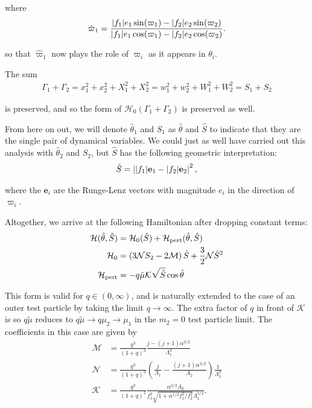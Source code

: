 \documentclass[usenatbib,twocolumn]{mnras}
\DeclarePairedDelimiter{\abs}{|}{|}
\begin{document}
\noindent
where
\begin{equation}
\hat\varpi_1 = \frac{\abs{f_1} e_1\sin(\varpi_1) -
  \abs{f_2}e_2\sin(\varpi_2)} {\abs{f_1}e_1\cos(\varpi_1) -
  \abs{f_2}e_2\cos(\varpi_2)}.
\end{equation}

\noindent
so that \(\hat\varpi_1\) now plays the role of \(\varpi_i\) as it appears in \(\theta_i\).

The sum
\begin{align}
  \Gamma_1 +\Gamma_2 = x_1^2+x_2^2 + X_1^2 + X_2^2
  = w_1^2+w_2^2 + W_1^2 + W_2^2 = S_1 + S_2
\end{align}

\noindent
is preserved, and so the form of \(\mathcal H_0(\Gamma_1+\Gamma_2)\)
is preserved as well.

From here on out, we will denote \(\hat\theta_1\) and \(S_1\) as
\(\hat\theta\) and \(\hat S\) to indicate that they are the single pair of
dynamical variables.  We could just as well have carried out this
analysis with \(\hat\theta_2\) and \(S_2\), but \(\hat S\) has the following
geometric interpretation:
\begin{align}
  \hat S = \left\lvert \abs{f_1}\mathbf{e}_1 - \abs{f_2}\mathbf{e}_2\right\rvert^2,
\end{align}

\noindent
where the \(\mathbf{e}_i\) are the Runge-Lenz vectors with magnitude
\(e_i\) in the direction of \(\varpi_i\).  

Altogether, we arrive at the following Hamiltonian after
dropping constant terms:
\begin{align}
  \label{eq:HShat}\mathcal H(\hat \theta, \hat S) &= \mathcal H_0(\hat S) + \mathcal H_{\rm pert}(\hat \theta, \hat S) \\
  \mathcal H_0
  &= \left( 3\mathcal NS_2 -2\mathcal M\right) \hat S
    + \frac32 \mathcal N \hat S^2 \\
  \mathcal H_{\rm pert}
  &= - q\tilde\mu\mathcal K\sqrt{\hat S}\cos\hat\theta
\end{align}

\noindent This form is valid for \(q\in (0,\infty)\), and is
naturally extended to the case of an outer test particle by taking the
limit \(q\to\infty\).  The extra factor of \(q\) in front of \(\mathcal K\)
is so \(q\tilde\mu\) reduces to \(q\tilde\mu\to q\mu_2 \to \mu_1\) in the
\(m_2=0\) test particle limit.  The coefficients in this case are given
by
\begin{align}
  \mathcal M
  &= \frac{q^3}{(1+q)^3}\frac{j-(j+1)\alpha^{3/2}}{\Lambda_1^3}\\
  \mathcal N
  &= \frac{q^3}{(1+q)^3}\left(
    \frac{j}{\Lambda_1} - \frac{(j+1)\alpha^{3/2}}{\Lambda_2}
    \right)\frac{1}{\Lambda_1^3}\\
  \mathcal K
  &= \frac{q^2}{(1+q)^2}
    \frac{\alpha^{3/2}\Lambda_2}{f_1^2\sqrt{1+\alpha^{1/2}f_1^2/f_2^2}\Lambda_1^{5/2}}.\\
\end{align}
\end{document}
